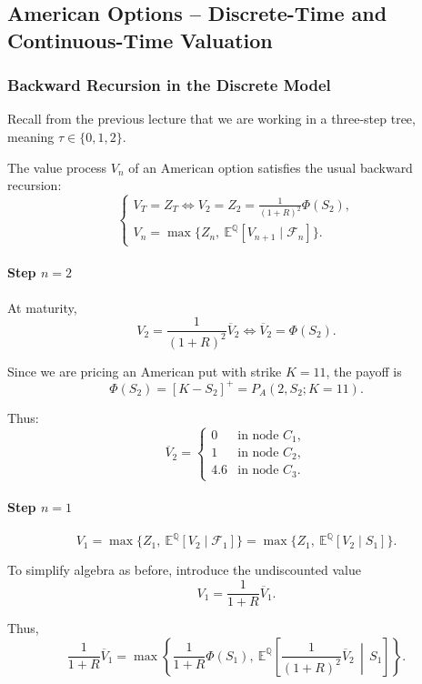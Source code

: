 \documentclass[12pt,a4paper]{article}
\theoremstyle{definition}
\begin{document}
\subsection{American Options -- Discrete-Time and Continuous-Time Valuation}

\subsubsection{Backward Recursion in the Discrete Model}

Recall from the previous lecture that we are working in a three-step tree, meaning $\tau \in \{0, 1, 2\}$.

The value process $V_n$ of an American option satisfies the usual backward recursion:
\[
\begin{cases}
V_T = Z_T \iff V_2 = Z_2 = \frac{1}{(1+R)^2} \Phi(S_2), \\
V_n = \max\{Z_n, \ \mathbb{E}^{\mathbb{Q}}[V_{n+1} \mid \mathcal{F}_n]\}.
\end{cases}
\]

\paragraph{Step $n = 2$}

At maturity,
\[
V_2 = \frac{1}{(1+R)^2} \overline{V}_2 \iff \overline{V}_2 = \Phi(S_2).
\]

Since we are pricing an American put with strike $K = 11$, the payoff is
\[
\Phi(S_2) = [K - S_2]^+ = P_A(2, S_2; K = 11).
\]

Thus:
\[
\overline{V}_2 = 
\begin{cases}
0 & \text{in node } C_1, \\
1 & \text{in node } C_2, \\
4.6 & \text{in node } C_3.
\end{cases}
\]

\paragraph{Step $n = 1$}

\[
V_1 = \max\{Z_1, \ \mathbb{E}^{\mathbb{Q}}[V_2 \mid \mathcal{F}_1]\} = \max\{Z_1, \ \mathbb{E}^{\mathbb{Q}}[V_2 \mid S_1]\}.
\]

To simplify algebra as before, introduce the undiscounted value
\[
V_1 = \frac{1}{1+R} \overline{V}_1.
\]

Thus,
\[
\frac{1}{1+R} \overline{V}_1 = \max\left\{\frac{1}{1+R} \Phi(S_1), \ \mathbb{E}^{\mathbb{Q}}\!\left[\frac{1}{(1+R)^2} \overline{V}_2 \,\middle|\, S_1\right]\right\}.
\]
\end{document}
